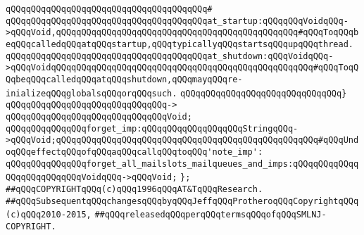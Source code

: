 \verb|qQQqqQQqqQQqqQQqqQQqqQQqqQQqqQQqqQQqqQQq#|\newline
\verb|qQQqqQQqqQQqqQQqqQQqqQQqqQQqqQQqqQQqqQQqat_startup:qQQqqQQqVoidqQQq->qQQqVoid,qQQqqQQqqQQqqQQqqQQqqQQqqQQqqQQqqQQqqQQqqQQqqQQq#qQQqToqQQqbeqQQqcalledqQQqatqQQqstartup,qQQqtypicallyqQQqstartsqQQqupqQQqthread.|\newline
\verb|qQQqqQQqqQQqqQQqqQQqqQQqqQQqqQQqqQQqqQQqat_shutdown:qQQqVoidqQQq->qQQqVoidqQQqqQQqqQQqqQQqqQQqqQQqqQQqqQQqqQQqqQQqqQQqqQQqqQQq#qQQqToqQQqbeqQQqcalledqQQqatqQQqshutdown,qQQqmayqQQqre-inializeqQQqglobalsqQQqorqQQqsuch.|\newline
\verb|qQQqqQQqqQQqqQQqqQQqqQQqqQQqqQQq}|\newline
\verb|qQQqqQQqqQQqqQQqqQQqqQQqqQQqqQQq->|\newline
\verb|qQQqqQQqqQQqqQQqqQQqqQQqqQQqqQQqVoid;|\newline
\newline
\verb|qQQqqQQqqQQqqQQqforget_imp:qQQqqQQqqQQqqQQqqQQqStringqQQq->qQQqVoid;qQQqqQQqqQQqqQQqqQQqqQQqqQQqqQQqqQQqqQQqqQQqqQQqqQQq#qQQqUndoqQQqeffectqQQqofqQQqaqQQqcallqQQqtoqQQq'note_imp':|\newline
\newline
\verb|qQQqqQQqqQQqqQQqforget_all_mailslots_mailqueues_and_imps:qQQqqQQqqQQqqQQqqQQqqQQqqQQqVoidqQQq->qQQqVoid;|\newline
\verb|};|\newline
\newline
\newline
\verb|##qQQqCOPYRIGHTqQQq(c)qQQq1996qQQqAT&TqQQqResearch.|\newline
\verb|##qQQqSubsequentqQQqchangesqQQqbyqQQqJeffqQQqProtheroqQQqCopyrightqQQq(c)qQQq2010-2015,|\newline
\verb|##qQQqreleasedqQQqperqQQqtermsqQQqofqQQqSMLNJ-COPYRIGHT.|\newline

